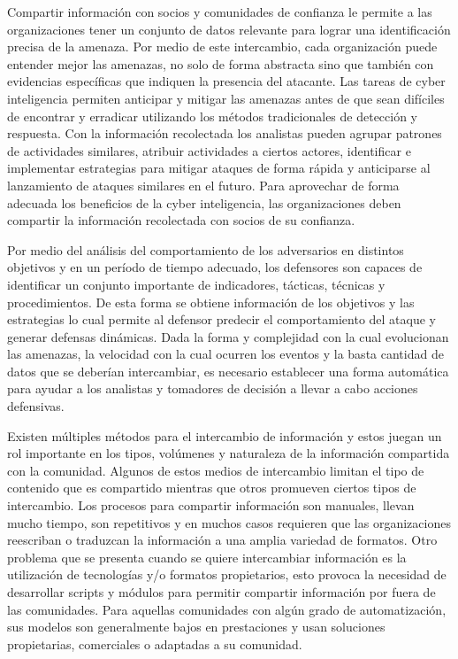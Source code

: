 Compartir información con socios y comunidades de confianza le permite a las 
organizaciones tener un conjunto de datos relevante para lograr una 
identificación precisa de la amenaza. Por medio de este intercambio, cada organización 
puede entender mejor las amenazas, no 
solo de forma abstracta sino que también con evidencias específicas que 
indiquen la presencia del atacante. Las tareas de cyber inteligencia permiten 
anticipar y mitigar las amenazas antes de que sean difíciles de encontrar y 
erradicar utilizando los métodos tradicionales de detección y respuesta. Con la 
información recolectada los analistas pueden agrupar patrones de actividades 
similares, atribuir actividades a ciertos actores, identificar e implementar 
estrategias para mitigar ataques de forma rápida y anticiparse al lanzamiento de 
ataques similares en el futuro. Para aprovechar de forma adecuada los beneficios 
de la cyber inteligencia, las organizaciones deben compartir la información 
recolectada con socios de su confianza.

Por medio del análisis del comportamiento de los adversarios en distintos 
objetivos y en un período de tiempo adecuado, los defensores son capaces de 
identificar un conjunto importante de indicadores, tácticas, técnicas y 
procedimientos. De esta forma se obtiene información de los objetivos y las 
estrategias lo cual permite al defensor predecir el comportamiento del ataque y 
generar defensas dinámicas. Dada la forma y complejidad con la cual evolucionan 
las amenazas, la velocidad con la cual ocurren los eventos y la basta cantidad 
de datos que se deberían intercambiar, es necesario establecer una forma 
automática para ayudar a los analistas y tomadores de decisión a llevar a cabo 
acciones defensivas.

Existen múltiples métodos para el intercambio de información y estos juegan un rol 
importante en los tipos, volúmenes y naturaleza de la información compartida 
con la comunidad. Algunos de estos medios de intercambio limitan el tipo de 
contenido que es compartido mientras que otros promueven ciertos tipos de 
intercambio. Los procesos para compartir información son manuales, llevan mucho 
tiempo, son repetitivos y en muchos casos requieren que las organizaciones 
reescriban o traduzcan la información a una amplia variedad de formatos. Otro 
problema que se presenta cuando se quiere intercambiar información es la 
utilización de tecnologías y/o formatos propietarios, esto provoca la necesidad 
de desarrollar scripts y módulos para permitir compartir información por fuera 
de las comunidades. Para aquellas comunidades con algún grado de automatización, 
sus modelos son generalmente bajos en prestaciones y usan soluciones 
propietarias, comerciales o adaptadas a su comunidad.

